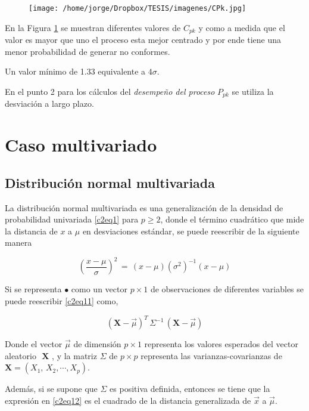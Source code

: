 \documentclass[spanish]{report}
\begin{document}
\begin{figure}[H]
\centering
\texttt{[image: /home/jorge/Dropbox/TESIS/imagenes/CPk.jpg]}
\caption{}
\label{c2f3}
\end{figure}

En la Figura \ref{c2f3} se muestran diferentes valores de $C_{pk}$ y como a
medida que el valor es mayor que uno el proceso esta mejor centrado
y por ende tiene una menor probabilidad de generar no conformes.


Un valor mínimo de 1.33 equivalente a $4\sigma$.

En el punto 2 para los cálculos del \emph{desempeño del proceso} $P_{pk}$ se utiliza la desviación a largo plazo.

\section{Caso multivariado}

\subsection{Distribución normal multivariada}
La distribución normal multivariada es una generalización de la densidad de probabilidad univariada \ref{c2eq1} para $p \geq 2$, donde el término cuadrático que mide la distancia de $x$ a $\mu$ en desviaciones estándar, se puede reescribir de la siguiente manera

\begin{equation}
\left(\frac{x-\mu}{\sigma}\right)^2\,=\,(x-\mu)(\sigma^2)^{-1}(x-\mu)
\label{c2eq11}
\end{equation}

Si se representa $\textbf{•}$ como un vector $p \times 1$ de observaciones de diferentes variables se puede reescribir \ref{c2eq11} como,

\begin{equation}
(\textbf{X}-\vec{\mu})^T\,\Sigma^{-1}\,(\textbf{X}-\vec{\mu})
\label{c2eq12}
\end{equation}


Donde el vector $\vec{\mu}$ de dimensión $p \times 1$ representa los valores esperados del vector aleatorio $\textbf{ X }$, y la matriz $\Sigma$ de $p \times p$ representa las varianzas-covarianzas de $\textbf{X}=(X_1,\,X_2,\cdots,X_p)$.

Además, si se supone que $\Sigma$ es positiva definida, entonces se tiene que la expresión en \ref{c2eq12} es el cuadrado de la distancia generalizada de $\vec{x}$ a $\vec{\mu}$.
\end{document}
